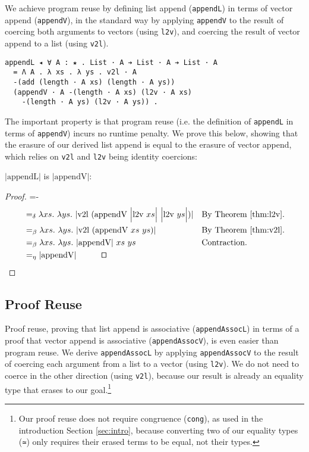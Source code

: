 \documentclass[a4paper,envcountsame,envcountsect]{llncs}
\newcommand{\eqed}[0]{\tag*{\qed}}
\newcommand{\refsec}[1]{Section \ref{sec:#1}}
\newcommand{\labsec}[1]{\label{sec:#1}}
\newcommand{\refthm}[1]{Theorem \ref{thm:#1}}
\newcommand{\labthm}[1]{\label{thm:#1}}
\newcommand{\earg}[1]{\,\,#1}
\newcommand{\erase}[1]{\ensuremath{\lvert #1 \rvert}}
\newcommand{\Erase}[1]{\ensuremath{\Big\lvert #1 \Big\rvert}}
\newcommand{\fun}[1]{\lambda #1 .~}
\newcommand{\by}[1]{\text{#1}}
\newcommand{\name}[1]{\textrm{#1}}
\begin{document}
We achieve program reuse by defining list append
(\texttt{appendL}) in terms of vector append (\texttt{appendV}), in the
standard way by applying \texttt{appendV} to the result of coercing
both arguments to vectors (using \texttt{l2v}), and coercing the
result of vector append to a list (using \texttt{v2l}).

\begin{verbatim}
appendL ◂ ∀ A : ★ . List · A ➔ List · A ➔ List · A
  = Λ A . λ xs . λ ys . v2l · A
  -(add (length · A xs) (length · A ys))
  (appendV · A -(length · A xs) (l2v · A xs)
    -(length · A ys) (l2v · A ys)) .
\end{verbatim}

The important property is that program reuse (i.e. the definition of
\texttt{appendL} in terms of \texttt{appendV}) incurs no runtime
penalty. We prove this below, showing that the erasure of our derived
list append is equal to the erasure of vector append, which relies on
\texttt{v2l} and \texttt{l2v} being identity coercions:

\begin{theorem}
\erase{\name{appendL}} is \erase{\name{appendV}}:
\labthm{appendl}
\end{theorem}

\begin{proof}
{\small
\abovedisplayskip=-\baselineskip
\begin{align*}
  &=_\delta \fun{xs} \fun{ys} \erase{
    \name{v2l} \earg (
    \name{appendV} \earg
    \Erase{\name{l2v} \earg xs} \earg \Erase{\name{l2v} \earg ys}
    )
  }
  && \by{By \refthm{l2v}.}
  \\
  &=_\beta \fun{xs} \fun{ys} \erase{
    \name{v2l} \earg (
    \name{appendV} \earg xs \earg ys
    )
  }
  && \by{By \refthm{v2l}.}
  \\
  &=_\beta \fun{xs} \fun{ys}
    \erase{\name{appendV}} \earg xs \earg ys
  && \by{Contraction.}
  \\
  &=_\eta \erase{\name{appendV}}
  \eqed
\end{align*}}
\end{proof}

\subsection{Proof Reuse}
\labsec{vecreuse:proofreuse}

Proof reuse, proving that list append is associative
(\texttt{appendAssocL}) in terms of a proof that
vector append is associative (\texttt{appendAssocV}),
is even easier than program reuse. We derive
\texttt{appendAssocL} by applying
\texttt{appendAssocV} to the result of coercing each argument from a
list to a vector (using \texttt{l2v}). We do not need to coerce in the
other direction (using \texttt{v2l}), because our result is already an
equality type that erases to our goal.\footnote{Our proof reuse does
  not require congruence (\texttt{cong}), as used in the introduction
  \refsec{intro}, because converting two of our equality types
  (\texttt{≃}) only requires their erased terms to be equal, not their
  types.
  }
\end{document}
